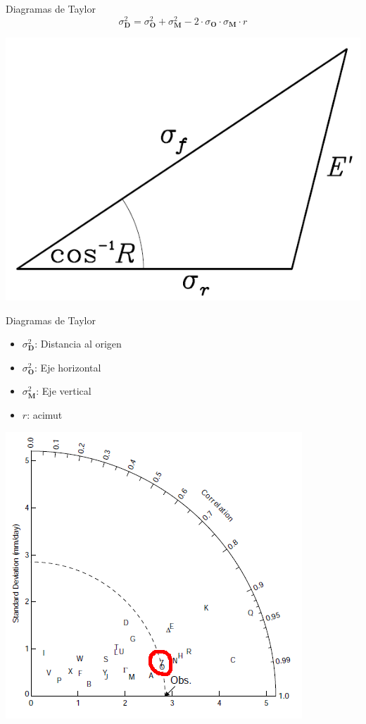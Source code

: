 \documentclass[xcolor={usenames,svgnames,dvipsnames}]{beamer}
\begin{document}
\begin{frame}[label=sec-7-4-8]{Diagramas de Taylor}
\[
\sigma^2_{\mathbf{D}} = \sigma^2_{\mathbf{O}}  + \sigma^2_{\mathbf{M}}
- 2 \cdot \sigma_{\mathbf{O}} \cdot \sigma_{\mathbf{M}} \cdot r 
\]

\begin{center}
\includegraphics[width=.9\linewidth]{../figs/cosenosDiagramaTaylor.png}
\end{center}
\end{frame}

\begin{frame}[label=sec-7-4-9]{Diagramas de Taylor}
\begin{itemize}
\item $\sigma^2_{\mathbf{D}}$: Distancia al origen
\item $\sigma^2_{\mathbf{O}}$: Eje horizontal
\item $\sigma^2_{\mathbf{M}}$: Eje vertical
\item $r$: acimut
\end{itemize}
\begin{center}
\includegraphics[height=0.6\textheight]{../figs/TaylorDiagrama.png}
\end{center}
\end{frame}
\end{document}
